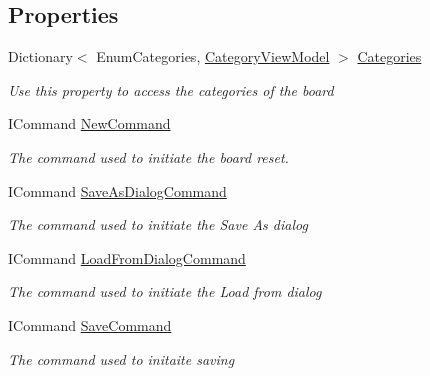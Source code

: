 \subsection*{Properties}
\begin{DoxyCompactItemize}
\item 
Dictionary$<$ Enum\+Categories, \hyperlink{class_kanban_board_1_1_view_model_1_1_category_view_model}{Category\+View\+Model} $>$ \hyperlink{class_kanban_board_1_1_view_model_1_1_main_view_model_a32bb0ead5d4aeb8664990a3ba13d5305}{Categories}
\begin{DoxyCompactList}\small\item\em Use this property to access the categories of the board \end{DoxyCompactList}\item 
I\+Command \hyperlink{class_kanban_board_1_1_view_model_1_1_main_view_model_ac8874b3c893afb269198991fb7780d3e}{New\+Command}
\begin{DoxyCompactList}\small\item\em The command used to initiate the board reset. \end{DoxyCompactList}\item 
I\+Command \hyperlink{class_kanban_board_1_1_view_model_1_1_main_view_model_a67c109d76784dcd84a0b3601689518e9}{Save\+As\+Dialog\+Command}
\begin{DoxyCompactList}\small\item\em The command used to initiate the Save As dialog \end{DoxyCompactList}\item 
I\+Command \hyperlink{class_kanban_board_1_1_view_model_1_1_main_view_model_ac78c41a4e5c852c2afdd853439def3b0}{Load\+From\+Dialog\+Command}
\begin{DoxyCompactList}\small\item\em The command used to initiate the Load from dialog \end{DoxyCompactList}\item 
I\+Command \hyperlink{class_kanban_board_1_1_view_model_1_1_main_view_model_ae8b5f8979602622e17bc76d377c8b4c2}{Save\+Command}
\begin{DoxyCompactList}\small\item\em The command used to initaite saving \end{DoxyCompactList}\end{DoxyCompactItemize}
